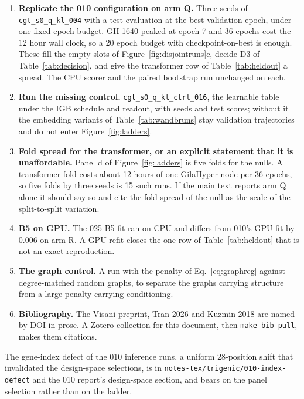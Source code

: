 \begin{enumerate}
\item \textbf{Replicate the 010 configuration on arm Q.} Three seeds of
  \texttt{cgt\_s0\_q\_kl\_004} with a test evaluation at the best validation epoch,
  under one fixed epoch budget. GH 1640 peaked at epoch 7 and 36 epochs cost the 12
  hour wall clock, so a 20 epoch budget with checkpoint-on-best is enough. These
  fill the empty slots of Figure~\ref{fig:disjointruns}c, decide D3 of
  Table~\ref{tab:decision}, and give the transformer row of
  Table~\ref{tab:heldout} a spread. The CPU scorer and the paired bootstrap run
  unchanged on each.
\item \textbf{Run the missing control.} \texttt{cgt\_s0\_q\_kl\_ctrl\_016}, the
  learnable table under the IGB schedule and readout, with seeds and test scores;
  without it the embedding variants of Table~\ref{tab:wandbruns} stay validation
  trajectories and do not enter Figure~\ref{fig:ladders}.
\item \textbf{Fold spread for the transformer, or an explicit statement that it is
  unaffordable.} Panel d of Figure~\ref{fig:ladders} is five folds for the nulls. A
  transformer fold costs about 12 hours of one GilaHyper node per 36 epochs, so five
  folds by three seeds is 15 such runs. If the main text reports arm Q alone it
  should say so and cite the fold spread of the null as the scale of the
  split-to-split variation.
\item \textbf{B5 on GPU.} The 025 B5 fit ran on CPU and differs from 010's GPU fit
  by 0.006 on arm R. A GPU refit closes the one row of Table~\ref{tab:heldout} that
  is not an exact reproduction.
\iflong
\item \textbf{The graph control.} A run with the penalty of Eq.~\ref{eq:graphreg}
  against degree-matched random graphs, to separate the graphs carrying structure
  from a large penalty carrying conditioning.
\fi
\item \textbf{Bibliography.} The Visani preprint, Tran 2026 and Kuzmin 2018 are
  named by DOI in prose. A Zotero collection for this document, then
  \texttt{make bib-pull}, makes them citations.
\end{enumerate}

\iflong
{}
The gene-index defect of the 010 inference runs, a uniform 28-position shift that
invalidated the design-space selections, is in \texttt{notes-tex/trigenic/010-index-defect}
and the 010 report's design-space section, and bears on the panel selection rather
than on the ladder.
\fi
